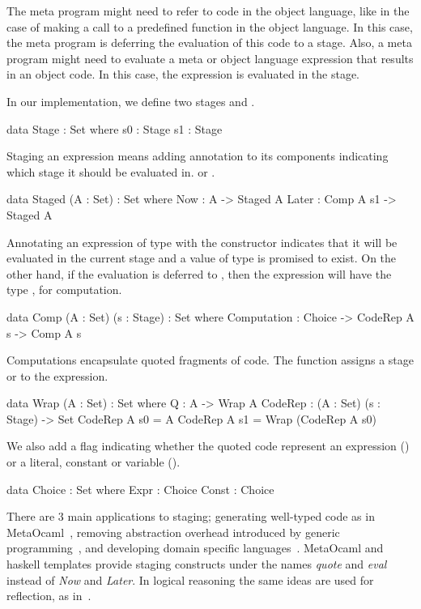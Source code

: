The meta program might need to refer to code in the object language, like in the case of making a call to a predefined function in the object language. In this case, the meta program is deferring the evaluation of this code to a  stage. 
Also, a meta program might need to evaluate a meta or object language expression that results in an object code. In this case, the expression is evaluated in the  stage. 

In our implementation, we define two stages  and . 
\begin{togcode}
data Stage : Set where
  s0 : Stage
  s1 : Stage
\end{togcode} 

Staging an expression means adding annotation to its components indicating which stage it should be evaluated in. 
 or . 
\begin{togcode} 
data Staged (A : Set) : Set where
  Now : A -> Staged A
  Later : Comp A s1 -> Staged A
\end{togcode} 
Annotating an expression of type  with the  constructor indicates that it will be evaluated in the current stage and a value of type  is promised to exist. On the other hand, if the evaluation is deferred to , then the expression will have the type , for computation. 
\begin{togcode} 
data Comp (A : Set) (s : Stage) : Set where
  Computation : Choice -> CodeRep A s -> Comp A s
\end{togcode} 
Computations encapsulate quoted fragments of code. The  function assigns a stage  or  to the expression. 
\begin{togcode} 
data Wrap (A : Set) : Set where
  Q : A -> Wrap A
CodeRep : (A : Set) (s : Stage) -> Set
  CodeRep A s0 = A
  CodeRep A s1 = Wrap (CodeRep A s0)
\end{togcode} 
We also add a flag indicating whether the quoted code represent an expression () or a literal, constant or variable ().  
\begin{togcode} 
data Choice : Set where
  Expr : Choice
  Const : Choice
\end{togcode} 

There are $3$ main applications to staging; generating well-typed code as in MetaOcaml~\cite{taha1999multi}, removing abstraction overhead introduced by generic programming~\cite{yallop2016StagingGeneric}, and developing domain specific languages~\cite{sheard2000stagingDSL}. MetaOcaml and haskell templates provide staging constructs under the names \emph{quote} and \emph{eval} instead of \emph{Now} and \emph{Later}. In logical reasoning the same ideas are used for reflection, as in~\cite{farmer2013quoteEval}. 

